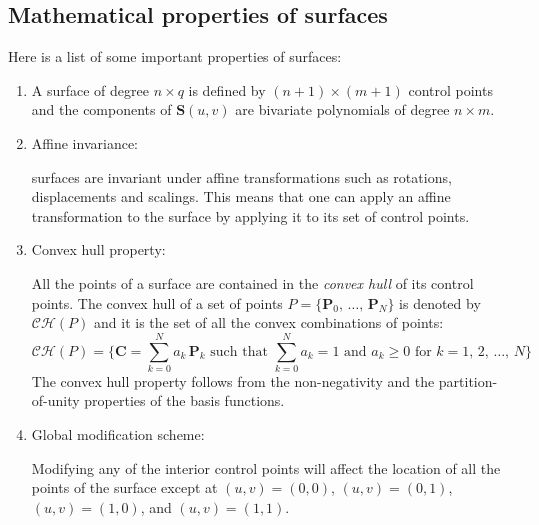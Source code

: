 \subsection{Mathematical properties of \Bezier surfaces}
Here is a list of some important properties of \Bezier surfaces:

\begin{enumerate}

    \item A \Bezier surface of degree $n \times q$ is defined by $(n+1) \times (m+1)$ control points and the components of $\mathbf{S}(u,v)$ are bivariate polynomials of degree $n \times m$.

    \item Affine invariance:
    
    \Bezier surfaces are invariant under affine transformations such as rotations, displacements and scalings. This means that one can apply an affine transformation to the \Bezier surface by applying it to its set of control points.
    
    \item Convex hull property:
    
    All the points of a \Bezier surface are contained in the \textit{convex hull} of its control points.
    The convex hull of a set of points $P = \{\mathbf{P}_{0},\, \dots,\, \mathbf{P}_{N}\}$ is denoted by $\mathcal{CH}(P)$ and it is the set of all the convex combinations of points:
    \begin{equation*}
     \mathcal{CH}(P) = \Big\{ \mathbf{C} =  \sum_{k=0}^{N} a_{k} \, \mathbf{P}_{k} \text{ such that } \sum_{k=0}^{N} a_{k} = 1 \text{ and } a_{k}\geq 0 \text{ for } k = 1,\, 2,\, \dots,\, N\Big\}
    \end{equation*}
    The convex hull property follows from the non-negativity and the partition-of-unity properties of the basis functions.

    \item Global modification scheme:
    
    Modifying any of the interior control points will affect the location of all the points of the \Bezier surface except at $(u,v)=(0,0)$, $(u,v)=(0,1)$, $(u,v)=(1,0)$, and $(u,v)=(1,1)$.
    

\end{enumerate}
